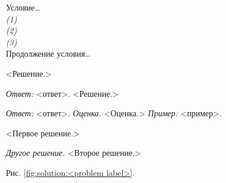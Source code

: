 Условие\ldots
\\\emph{(1)}
\\\emph{(2)}
\\\emph{(3)}
\\
Продолжение условия\ldots

\solution
<Решение.>

\solution
\emph{Ответ:} <ответ>.
<Решение.>

\solution
\emph{Ответ:} <ответ>.
\emph{Оценка.}
<Оценка.>
\emph{Пример:} <пример>.

\solution
<Первое решение.>
\par
\emph{Другое решение.}
<Второе решение.>

%
\label{solution:<problem label>}
Рис. \ref{fig:solution:<problem label>}.

